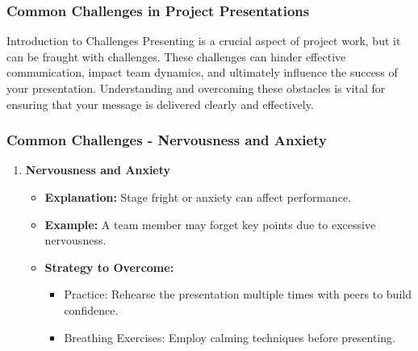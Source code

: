 \documentclass[aspectratio=169]{beamer}
\begin{document}
\begin{frame}[fragile]
    \frametitle{Common Challenges in Project Presentations}
    
    \begin{block}{Introduction to Challenges}
        Presenting is a crucial aspect of project work, but it can be fraught with challenges. 
        These challenges can hinder effective communication, impact team dynamics, and ultimately influence the success of your presentation.
        Understanding and overcoming these obstacles is vital for ensuring that your message is delivered clearly and effectively.
    \end{block}
\end{frame}

\begin{frame}[fragile]
    \frametitle{Common Challenges - Nervousness and Anxiety}
    
    \begin{enumerate}
        \item \textbf{Nervousness and Anxiety}
        \begin{itemize}
            \item \textbf{Explanation:} Stage fright or anxiety can affect performance.
            \item \textbf{Example:} A team member may forget key points due to excessive nervousness.
            \item \textbf{Strategy to Overcome:}
            \begin{itemize}
                \item Practice: Rehearse the presentation multiple times with peers to build confidence.
                \item Breathing Exercises: Employ calming techniques before presenting.
            \end{itemize}
        \end{itemize}
    \end{enumerate}
\end{frame}
\end{document}
